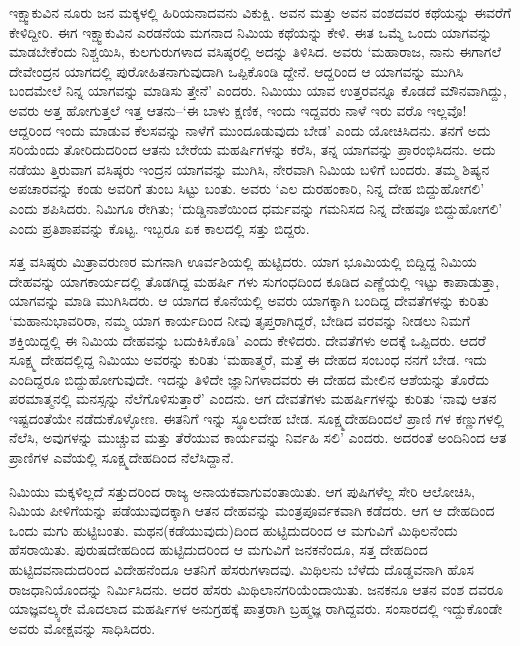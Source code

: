ಇಕ್ಷ್ವಾಕುವಿನ ನೂರು ಜನ ಮಕ್ಕಳಲ್ಲಿ ಹಿರಿಯನಾದವನು ವಿಕುಕ್ಷಿ. ಅವನ ಮತ್ತು ಅವನ ವಂಶದವರ ಕಥೆಯನ್ನು ಈವರೆಗೆ ಕೇಳಿದ್ದೀರಿ. ಈಗ ಇಕ್ಷ್ವಾಕುವಿನ ಎರಡನೆಯ ಮಗನಾದ ನಿಮಿಯ ಕಥೆಯನ್ನು ಕೇಳಿ. ಈತ ಒಮ್ಮೆ ಒಂದು ಯಾಗವನ್ನು ಮಾಡಬೇಕೆಂದು ನಿಶ್ಚಯಿಸಿ, ಕುಲಗುರುಗಳಾದ ವಸಿಷ್ಠರಲ್ಲಿ ಅದನ್ನು ತಿಳಿಸಿದ. ಅವರು ‘ಮಹಾರಾಜ, ನಾನು ಈಗಾಗಲೆ ದೇವೇಂದ್ರನ ಯಾಗದಲ್ಲಿ ಪುರೋಹಿತನಾಗುವುದಾಗಿ ಒಪ್ಪಿಕೊಂಡಿ ದ್ದೇನೆ. ಆದ್ದರಿಂದ ಆ ಯಾಗವನ್ನು ಮುಗಿಸಿ ಬಂದಮೇಲೆ ನಿನ್ನ ಯಾಗವನ್ನು ಮಾಡಿಸು ತ್ತೇನೆ’ ಎಂದರು. ನಿಮಿಯು ಯಾವ ಉತ್ತರವನ್ನೂ ಕೊಡದೆ ಮೌನವಾಗಿದ್ದು, ಅವರು ಅತ್ತ ಹೋಗುತ್ತಲೆ ಇತ್ತ ಆತನು–‘ಈ ಬಾಳು ಕ್ಷಣಿಕ, ಇಂದು ಇದ್ದವರು ನಾಳೆ ಇರು ವರೊ ಇಲ್ಲವೊ! ಆದ್ದರಿಂದ ಇಂದು ಮಾಡುವ ಕೆಲಸವನ್ನು ನಾಳೆಗೆ ಮುಂದೂಡುವುದು ಬೇಡ’ ಎಂದು ಯೋಚಿಸಿದನು. ತನಗೆ ಅದು ಸರಿಯೆಂದು ತೋರಿದುದರಿಂದ ಆತನು ಬೇರೆಯ ಮಹರ್ಷಿಗಳನ್ನು ಕರೆಸಿ, ತನ್ನ ಯಾಗವನ್ನು ಪ್ರಾರಂಭಿಸಿದನು. ಅದು ನಡೆಯು ತ್ತಿರುವಾಗ ವಸಿಷ್ಠರು ಇಂದ್ರನ ಯಾಗವನ್ನು ಮುಗಿಸಿ, ನೇರವಾಗಿ ನಿಮಿಯ ಬಳಿಗೆ ಬಂದರು. ತಮ್ಮ ಶಿಷ್ಯನ ಅಪಚಾರವನ್ನು ಕಂಡು ಅವರಿಗೆ ತುಂಬ ಸಿಟ್ಟು ಬಂತು. ಅವರು ‘ಎಲ ದುರಹಂಕಾರಿ, ನಿನ್ನ ದೇಹ ಬಿದ್ದುಹೋಗಲಿ’ ಎಂದು ಶಪಿಸಿದರು. ನಿಮಿಗೂ ರೇಗಿತು; ‘ದುಡ್ಡಿನಾಶೆಯಿಂದ ಧರ್ಮವನ್ನು ಗಮನಿಸದ ನಿನ್ನ ದೇಹವೂ ಬಿದ್ದುಹೋಗಲಿ’ ಎಂದು ಪ್ರತಿಶಾಪವನ್ನು ಕೊಟ್ಟ. ಇಬ್ಬರೂ ಏಕ ಕಾಲದಲ್ಲಿ ಸತ್ತು ಬಿದ್ದರು. 

ಸತ್ತ ವಸಿಷ್ಠರು ಮಿತ್ರಾವರುಣರ ಮಗನಾಗಿ ಊರ್ವಶಿಯಲ್ಲಿ ಹುಟ್ಟಿದರು. ಯಾಗ ಭೂಮಿಯಲ್ಲಿ ಬಿದ್ದಿದ್ದ ನಿಮಿಯ ದೇಹವನ್ನು ಯಾಗಕಾರ್ಯದಲ್ಲಿ ತೊಡಗಿದ್ದ ಮಹರ್ಷಿ ಗಳು ಸುಗಂಧದಿಂದ ಕೂಡಿದ ಎಣ್ಣೆಯಲ್ಲಿ ಇಟ್ಟು ಕಾಪಾಡುತ್ತಾ, ಯಾಗವನ್ನು ಮಾಡಿ ಮುಗಿಸಿದರು. ಆ ಯಾಗದ ಕೊನೆಯಲ್ಲಿ ಅವರು ಯಾಗಕ್ಕಾಗಿ ಬಂದಿದ್ದ ದೇವತೆಗಳನ್ನು ಕುರಿತು ‘ಮಹಾನುಭಾವರಿರಾ, ನಮ್ಮ ಯಾಗ ಕಾರ್ಯದಿಂದ ನೀವು ತೃಪ್ತರಾಗಿದ್ದರೆ, ಬೇಡಿದ ವರವನ್ನು ನೀಡಲು ನಿಮಗೆ ಶಕ್ತಿಯಿದ್ದಲ್ಲಿ ಈ ನಿಮಿಯ ದೇಹವನ್ನು ಬದುಕಿಸಿಕೊಡಿ’ ಎಂದು ಕೇಳಿದರು. ದೇವತೆಗಳು ಅದಕ್ಕೆ ಒಪ್ಪಿದರು. ಆದರೆ ಸೂಕ್ಷ್ಮ ದೇಹದಲ್ಲಿದ್ದ ನಿಮಿಯು ಅವರನ್ನು ಕುರಿತು ‘ಮಹಾತ್ಮರೆ, ಮತ್ತೆ ಈ ದೇಹದ ಸಂಬಂಧ ನನಗೆ ಬೇಡ. ಇದು ಎಂದಿದ್ದರೂ ಬಿದ್ದುಹೋಗುವುದೇ. ಇದನ್ನು ತಿಳಿದೇ ಜ್ಞಾನಿಗಳಾದವರು ಈ ದೇಹದ ಮೇಲಿನ ಆಶೆಯನ್ನು ತೊರೆದು ಪರಮಾತ್ಮನಲ್ಲಿ ಮನಸ್ಸನ್ನು ನೆಲೆಗೊಳಿಸುತ್ತಾರೆ’ ಎಂದನು. ಆಗ ದೇವತೆಗಳು ಮಹರ್ಷಿಗಳನ್ನು ಕುರಿತು ‘ನಾವು ಆತನ ಇಷ್ಟದಂತೆಯೇ ನಡೆದುಕೊಳ್ಳೋಣ. ಈತನಿಗೆ ಇನ್ನು ಸ್ಥೂಲದೇಹ ಬೇಡ. ಸೂಕ್ಷ್ಮದೇಹದಿಂದಲೆ ಪ್ರಾಣಿ ಗಳ ಕಣ್ಣುಗಳಲ್ಲಿ ನೆಲೆಸಿ, ಅವುಗಳನ್ನು ಮುಚ್ಚುವ ಮತ್ತು ತೆರೆಯುವ ಕಾರ್ಯವನ್ನು ನಿರ್ವಹಿ ಸಲಿ’ ಎಂದರು. ಅದರಂತೆ ಅಂದಿನಿಂದ ಆತ ಪ್ರಾಣಿಗಳ ಎವೆಯಲ್ಲಿ ಸೂಕ್ಷ್ಮದೇಹದಿಂದ ನೆಲೆಸಿದ್ದಾನೆ.

ನಿಮಿಯು ಮಕ್ಕಳಿಲ್ಲದೆ ಸತ್ತುದರಿಂದ ರಾಜ್ಯ ಅನಾಯಕವಾಗುವಂತಾಯಿತು. ಆಗ ಪುಷಿಗಳೆಲ್ಲ ಸೇರಿ ಆಲೋಚಿಸಿ, ನಿಮಿಯ ಪೀಳಿಗೆಯನ್ನು ಪಡೆಯುವುದಕ್ಕಾಗಿ ಆತನ ದೇಹವನ್ನು ಮಂತ್ರಪೂರ್ವಕವಾಗಿ ಕಡೆದರು. ಆಗ ಆ ದೇಹದಿಂದ ಒಂದು ಮಗು ಹುಟ್ಟಿಬಂತು. ಮಥನ(ಕಡೆಯುವುದು)ದಿಂದ ಹುಟ್ಟಿದುದರಿಂದ ಆ ಮಗುವಿಗೆ ಮಿಥಿಲನೆಂದು ಹೆಸರಾಯಿತು. ಪುರುಷದೇಹದಿಂದ ಹುಟ್ಟಿದುದರಿಂದ ಆ ಮಗುವಿಗೆ ಜನಕನೆಂದೂ, ಸತ್ತ ದೇಹದಿಂದ ಹುಟ್ಟಿದವನಾದುದರಿಂದ ವಿದೇಹನೆಂದೂ ಆತನಿಗೆ ಹೆಸರುಗಳಾದವು. ಮಿಥಿಲನು ಬೆಳೆದು ದೊಡ್ಡವನಾಗಿ ಹೊಸ ರಾಜಧಾನಿಯೊಂದನ್ನು ನಿರ್ಮಿಸಿದನು. ಅದರ ಹೆಸರು ಮಿಥಿಲಾನಗರಿಯೆಂದಾಯಿತು. ಜನಕನೂ ಆತನ ವಂಶ ದವರೂ ಯಾಜ್ಞವಲ್ಕ್ಯರೇ ಮೊದಲಾದ ಮಹರ್ಷಿಗಳ ಅನುಗ್ರಹಕ್ಕೆ ಪಾತ್ರರಾಗಿ ಬ್ರಹ್ಮಜ್ಞ ರಾಗಿದ್ದವರು. ಸಂಸಾರದಲ್ಲಿ ಇದ್ದುಕೊಂಡೇ ಅವರು ಮೋಕ್ಷವನ್ನು ಸಾಧಿಸಿದರು.


